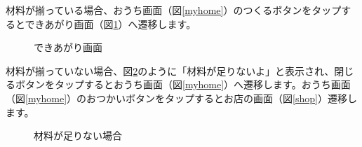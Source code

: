\documentclass[a4j]{jarticle}
\begin{document}
材料が揃っている場合、おうち画面（図\ref{myhome}）のつくるボタンをタップするとできあがり画面（図\ref{completion}）へ遷移します。

\begin{figure}[H]
    \begin{center}
    \caption {できあがり画面}
    \label{completion}
    \end{center}
\end{figure}

材料が揃っていない場合、図\ref{otukai6}のように「材料が足りないよ」と表示され、閉じるボタンをタップするとおうち画面（図\ref{myhome}）へ遷移します。おうち画面（図\ref{myhome}）のおつかいボタンをタップするとお店の画面（図\ref{shop}）遷移します。

\begin{figure}[H]
    \begin{center}
    \caption {材料が足りない場合}
    \label{otukai6}
    \end{center}
\end{figure}
\end{document}
